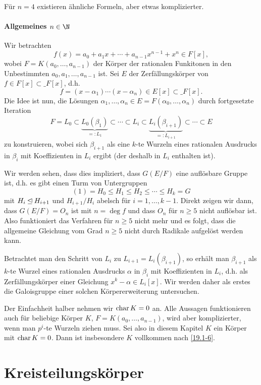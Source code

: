 Für $n = 4$ existieren ähnliche Formeln, aber etwas komplizierter.

\paragraph{Allgemeines $n \in \N$}

Wir betrachten
\[
	f(x) = a_0 + a_1 x + \dotsb + a_{n-1} x^{n-1} + x^n \in F[x],
\]
wobei $F = K(a_0, \dotsc, a_{n-1})$ der Körper der rationalen Funkitonen in den Unbestimmten $a_0, a_1, \dotsc, a_{n-1}$ ist.
Sei $E$ der Zerfällungskörper von $f \in F[x] \subset \_F[x]$, d.h.
\[
	f = (x-\alpha_1) \dotsb (x-\alpha_n) \in E[x] \subset \_F[x].
\]
Die Idee ist nun, die Lösungen $\alpha_1, \dotsc, \alpha_n \in E = F(\alpha_0, \dotsc, \alpha_n)$ durch fortgesetzte Iteration
\[
	F = L_0 \subset \underbrace{L_0 (\beta_1)}_{=:L_1} \subset \dotsb \subset L_i \subset \underbrace{L_i(\beta_{i+1})}_{=:L_{i+1}} \subset \dotsb \subset E
\]
zu konstruieren, wobei sich $\beta_{i+1}$ als eine $k$-te Wurzeln eines rationalen Ausdrucks in $\beta_i$ mit Koeffizienten in $L_i$ ergibt (der deshalb in $L_i$ enthalten ist).

Wir werden sehen, dass dies impliziert, dass $G(E / F)$ eine auflösbare Gruppe ist, d.h. es gibt einen Turm von Untergruppen
\[
	(1) = H_0 \le H_1 \le H_2 \le \dotsb \le H_k = G
\]
mit $H_i \mathbin{\trianglelefteq} H_{i+1}$ und $H_{i+1} / H_i$ abelsch für $i = 1, \dotsc, k-1$.
Direkt zeigen wir dann, dass $G(E / F) = O_n$ ist mit $n = \deg f$ und dass $O_n$ für $n \ge 5$ nicht auflösbar ist.
Also funktioniert das Verfahren für $n \ge 5$ nicht mehr und es folgt, dass die allgemeine Gleichung vom Grad $n \ge 5$ nicht durch Radikale aufgelöst werden kann.

Betrachtet man den Schritt von $L_i$ zu $L_{i+1} = L_i(\beta_{i+1})$, so erhält man $\beta_{i+1}$ als $k$-te Wurzel eines rationalen Ausdrucks $\alpha$ in $\beta_i$ mit Koeffizienten in $L_i$, d.h. als Zerfällungskörper einer Gleichung $x^k - \alpha \in L_i[x]$.
Wir werden daher als erstes die Galoisgruppe einer solchen Körpererweiterung untersuchen.

Der Einfachheit halber nehmen wir $\operatorname{char} K = 0$ an.
Alle Aussagen funktionieren auch für beliebige Körper $K$, $F = K(a_0, \dotsc, a_{n-1})$, wird aber komplizierter, wenn man $p^i$-te Wurzeln ziehen muss.
Sei also in diesem Kapitel $K$ ein Körper mit $\operatorname{char} K = 0$.
Dann ist insbesondere $K$ vollkommen nach \ref{19.1-6}.


\section{Kreisteilungskörper}

